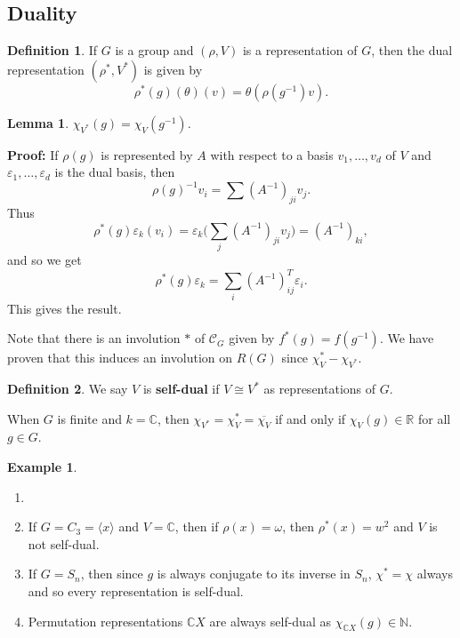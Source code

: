 \documentclass[12pt]{article}
\newtheorem{lemma}{Lemma}[section]
\theoremstyle{definition}
\newtheorem{definition}{Definition}[section]
\newtheorem{example}{Example}[section]
\theoremstyle{remark}
\begin{document}
\subsection{Duality}%
\label{sub:duality}

\begin{definition}
	If $G$ is a group and $(\rho, V)$ is a representation of $G$, then the dual representation $(\rho^{\ast}, V^{\ast})$ is given by
	\[
		\rho^{\ast}(g) (\theta)(v) = \theta(\rho(g^{-1})v)
	.\]
\end{definition}

\begin{lemma}
	$\chi_{V^{\ast}}(g) = \chi_{V}(g^{-1})$.
\end{lemma}

\begin{adjustbox}{minipage = \columnwidth - 25.5pt, margin=1em, frame=1pt, margin=0em}
	\textbf{Proof:} If $\rho(g)$ is represented by $A$ with respect to a basis $v_1, \ldots, v_d$ of $V$ and $\varepsilon_1, \ldots, \varepsilon_d$ is the dual basis, then
	\[
		\rho(g)^{-1}v_i = \sum (A^{-1})_{ji} v_j
	.\]
	Thus
	\[
		\rho^{\ast}(g) \varepsilon_k(v_i) = \varepsilon_k \Biggl( \sum_{j} (A^{-1})_{ji} v_j \Biggr) = (A^{-1})_{ki}
	,\]
	and so we get
	\[
		\rho^{\ast}(g) \varepsilon_k = \sum_{i}(A^{-1})^{T}_{ij} \varepsilon_i
	.\]
	This gives the result.
\end{adjustbox}

Note that there is an involution $\ast$ of $\mathcal{C}_G$ given by $f^{\ast}(g) = f(g^{-1})$. We have proven that this induces an involution on $R(G)$ since $\chi_V^{\ast} - \chi_{V^{\ast}}$.

\begin{definition}
	We say $V$ is \textbf{self-dual} if $V \cong V^{\ast}$ as representations of $G$.
\end{definition}

When $G$ is finite and $k = \mathbb{C}$, then $\chi_{V^{\ast}} = \chi_{V}^{\ast} = \overline{\chi_V}$ if and only if $\chi_V(g) \in \mathbb{R}$ for all $g \in G$.

\begin{adjustbox}{minipage = \columnwidth - 25.5pt, margin=1em, frame=1pt, margin=0em}
\begin{example}
	\begin{enumerate}[1.]
		\item[]
		\item If $G = C_3 = \langle x \rangle$ and $V = \mathbb{C}$, then if $\rho(x) = \omega$, then $\rho^{\ast}(x) = w^2$ and $V$ is not self-dual.
		\item If $G = S_n$, then since $g$ is always conjugate to its inverse in $S_n$, $\chi^{\ast} = \chi$ always and so every representation is self-dual.
		\item Permutation representations $\mathbb{C}X$ are always self-dual as $\chi_{\mathbb{C}X}(g) \in \mathbb{N}$.
	\end{enumerate}
\end{example}
\end{adjustbox}
\end{document}

